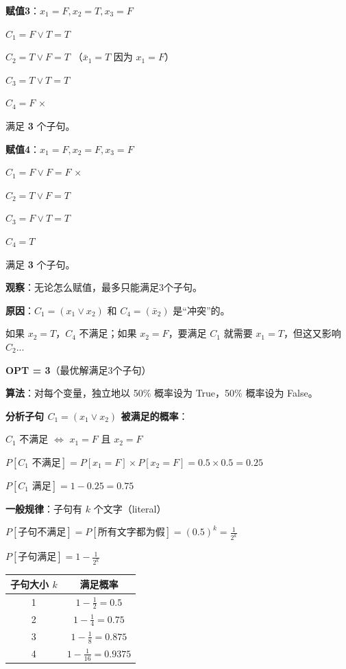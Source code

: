\documentclass[12pt, a4paper]{ctexart}
\begin{document}
\begin{blackboard}[继续枚举]

\textbf{赋值3}：$x_1 = F, x_2 = T, x_3 = F$

$C_1 = F \vee T = T$ \checkmark

$C_2 = T \vee F = T$ \checkmark（$\bar{x}_1 = T$ 因为 $x_1 = F$）

$C_3 = T \vee T = T$ \checkmark

$C_4 = F$ $\times$

满足 \textbf{3} 个子句。

\textbf{赋值4}：$x_1 = F, x_2 = F, x_3 = F$

$C_1 = F \vee F = F$ $\times$

$C_2 = T \vee F = T$ \checkmark

$C_3 = F \vee T = T$ \checkmark

$C_4 = T$ \checkmark

满足 \textbf{3} 个子句。

\textbf{观察}：无论怎么赋值，最多只能满足3个子句。

\textbf{原因}：$C_1 = (x_1 \vee x_2)$ 和 $C_4 = (\bar{x}_2)$ 是``冲突''的。

如果 $x_2 = T$，$C_4$ 不满足；如果 $x_2 = F$，要满足 $C_1$ 就需要 $x_1 = T$，但这又影响 $C_2$...

\textbf{OPT = 3}（最优解满足3个子句）

\end{blackboard}

\begin{blackboard}[方法1：纯随机算法（不用 LP！）]

\textbf{算法}：对每个变量，独立地以 50\% 概率设为 True，50\% 概率设为 False。

\textbf{分析子句 $C_1 = (x_1 \vee x_2)$ 被满足的概率}：

$C_1$ 不满足 $\Leftrightarrow$ $x_1 = F$ 且 $x_2 = F$

$P[C_1 \text{ 不满足}] = P[x_1 = F] \times P[x_2 = F] = 0.5 \times 0.5 = 0.25$

$P[C_1 \text{ 满足}] = 1 - 0.25 = \mathbf{0.75}$

\textbf{一般规律}：子句有 $k$ 个文字（literal）

$P[\text{子句不满足}] = P[\text{所有文字都为假}] = (0.5)^k = \frac{1}{2^k}$

$P[\text{子句满足}] = 1 - \frac{1}{2^k}$

\begin{center}
\begin{tabular}{c|c}
子句大小 $k$ & 满足概率 \\
\hline
1 & $1 - \frac{1}{2} = 0.5$ \\
2 & $1 - \frac{1}{4} = 0.75$ \\
3 & $1 - \frac{1}{8} = 0.875$ \\
4 & $1 - \frac{1}{16} = 0.9375$
\end{tabular}
\end{center}

\end{blackboard}
\end{document}
